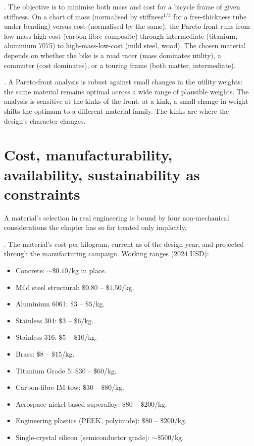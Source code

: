 . The objective
is to minimise both mass and cost for a bicycle frame of given
stiffness. On a chart of mass (normalised by stiffness$^{1/3}$ for a
free-thickness tube under bending) versus cost (normalised by the
same), the Pareto front runs from low-mass-high-cost (carbon-fibre
composite) through intermediate (titanium, aluminium 7075) to
high-mass-low-cost (mild steel, wood). The chosen material depends on
whether the bike is a road racer (mass dominates utility), a
commuter (cost dominates), or a touring frame (both matter,
intermediate).

. A Pareto-front analysis is
robust against small changes in the utility weights: the same
material remains optimal across a wide range of plausible weights.
The analysis is sensitive at the kinks of the front: at a kink, a
small change in weight shifts the optimum to a different material
family. The kinks are where the design's character changes.

\section{Cost, manufacturability, availability, sustainability as constraints}

A material's selection in real engineering is bound by four
non-mechanical considerations the chapter has so far treated only
implicitly.

. The material's cost per kilogram, current as of the
design year, and projected through the manufacturing campaign. Working
ranges (2024 USD):

\begin{itemize}[leftmargin=*]
\item Concrete: $\sim \$0.10$/kg in place.
\item Mild steel structural: $\$0.80$ -- $\$1.50$/kg.
\item Aluminium 6061: $\$3$ -- $\$5$/kg.
\item Stainless 304: $\$3$ -- $\$6$/kg.
\item Stainless 316: $\$5$ -- $\$10$/kg.
\item Brass: $\$8$ -- $\$15$/kg.
\item Titanium Grade 5: $\$30$ -- $\$60$/kg.
\item Carbon-fibre IM tow: $\$30$ -- $\$80$/kg.
\item Aerospace nickel-based superalloy: $\$80$ -- $\$200$/kg.
\item Engineering plastics (PEEK, polyimide): $\$80$ -- $\$200$/kg.
\item Single-crystal silicon (semiconductor grade): $\sim \$500$/kg.
\end{itemize}

